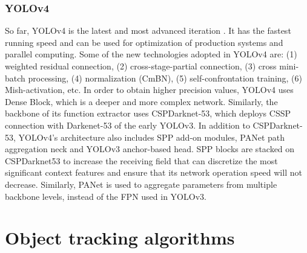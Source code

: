 \subsubsection{YOLOv4}
So far, YOLOv4 is the latest and most advanced iteration \cite{bochkovskiy2020yolov4}. It has the fastest running speed and can be used for optimization of production systems and parallel computing. Some of the new technologies adopted in YOLOv4 are: (1) weighted residual connection, (2) cross-stage-partial connection, (3) cross mini-batch processing, (4) normalization (CmBN), (5) self-confrontation training, (6) Mish-activation, etc. In order to obtain higher precision values, YOLOv4 uses Dense Block, which is a deeper and more complex network. Similarly, the backbone of its function extractor uses CSPDarknet-53, which deploys CSSP connection with Darkenet-53 of the early YOLOv3. In addition to CSPDarknet-53, YOLOv4's architecture also includes SPP add-on modules, PANet path aggregation neck and YOLOv3 anchor-based head. SPP blocks are stacked on CSPDarknet53 to increase the receiving field that can discretize the most significant context features and ensure that its network operation speed will not decrease. Similarly, PANet is used to aggregate parameters from multiple backbone levels, instead of the FPN used in YOLOv3.
\section{Object tracking algorithms}
